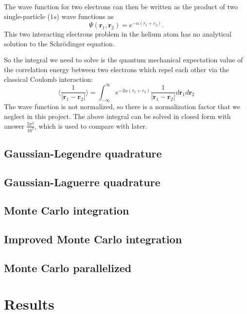 \documentclass[12pt,a4paper,english]{article}
\begin{document}
The wave function for two electrons can then be written as the product of two single-particle ($1s$) wave functions as
\begin{equation}
\label{eq:wave_2}
\Psi(\textbf{r}_1, \textbf{r}_2)=e^{-\alpha(r_1+r_2)}.
\end{equation}
This two interacting electrons problem in the helium atom has no analytical solution to the Schrödinger equation. 

So the integral we need to solve is the quantum mechanical expectation value of the correlation energy between two electrons which repel each other via the classical Coulomb interaction:
\begin{equation}
\langle\frac{1}{|\textbf{r}_1-\textbf{r}_2|}\rangle=\int_{-\infty}^{\infty}e^{-2\alpha(r_1+r_2)}\frac{1}{|\textbf{r}_1-\textbf{r}_2|}d\textbf{r}_1d\textbf{r}_2
\end{equation}
The wave function is not normalized, so there is a normalization factor that we neglect in this project. The above integral can be solved in closed form with answer $\frac{5\pi^2}{16^2}$, which is used to compare with later.

\subsection{Gaussian-Legendre quadrature}
\subsection{Gaussian-Laguerre quadrature}
\subsection{Monte Carlo integration}
\subsection{Improved Monte Carlo integration}
\subsection{Monte Carlo parallelized}
\section{Results}
\end{document}
